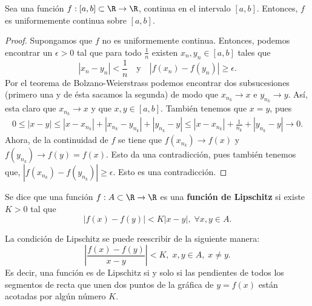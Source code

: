 \begin{ftheorem}[]
	\normalfont Sea una función $\displaystyle f : \left[a,b\right]\subset \R  \to \R $, continua en el intervalo $\displaystyle [a,b] $. Entonces, $\displaystyle f $ es uniformemente continua sobre $\displaystyle \left[a,b\right]  $.
\end{ftheorem}
\begin{proof}
	Supongamos que $\displaystyle f $ no es uniformemente continua. Entonces, podemos encontrar un $\displaystyle \epsilon > 0 $ tal que para todo $\displaystyle \frac{1}{n} $ existen $\displaystyle x_{n}, y_{n} \in [a,b] $ tales que 
	\[ \left|x_{n}-y_{n}\right| < \frac{1}{n} \quad \text{y}\quad \left|f\left(x_{n}\right)-f\left(y_{n}\right)\right| \geq \epsilon  .\]
	Por el teorema de Bolzano-Weierstrass podemos encontrar dos subsucesiones (primero una y de ésta sacamos la segunda) de modo que $\displaystyle x_{n_{k}} \to x $ e $\displaystyle y_{n_{k}} \to y $. Así, esta claro que $\displaystyle x_{n_{k}} \to x $ y que $\displaystyle x,y \in [a,b] $. También tenemos que $\displaystyle x = y $, pues
	\[
	\begin{split}
	0 \leq \left|x -y\right| \leq \left|x - x_{n_{k}}\right| + \left|x_{n_{k}}-y_{n_{k}}\right| + \left|y_{n_{k}}-y\right| \leq \left|x - x_{n_{k}}\right| + \frac{1}{n_{k}} + \left|y_{n_{k}} - y\right| \to 0 .
	\end{split}
	\]
	Ahora, de la continuidad de $\displaystyle f $ se tiene que $\displaystyle f\left(x_{n_{k}}\right) \to f\left(x\right) $ y $\displaystyle f\left(y_{n_{k}}\right)\to f\left(y\right) = f\left(x\right) $. Esto da una contradicción, pues también tenemos que, $\displaystyle \left|f\left(x_{n_{k}}\right)-f\left(y_{n_{k}}\right)\right| \geq \epsilon  $. Esto es una contradicción.
\end{proof}
\begin{fdefinition}
\normalfont Se dice que una función $\displaystyle f : A \subset \R \to \R $ es una \textbf{función de Lipschitz} si existe $\displaystyle K > 0 $ tal que 
\[ \left|f\left(x\right)-f\left(y\right)\right| < K \left|x-y\right|, \; \forall x,y \in A .\]
\end{fdefinition}
\begin{observation}
\normalfont La condición de Lipschitz se puede reescribir de la siguiente manera:
\[ \left|\frac{f\left(x\right)-f\left(y\right)}{x-y}\right| < K , \; x,y \in A, \; x \neq y.\]
Es decir, una función es de Lipschitz si y solo si las pendientes de todos los segmentos de recta que unen dos puntos de la gráfica de $\displaystyle y = f\left(x\right) $ están acotadas por algún número $\displaystyle K $.
\end{observation}
